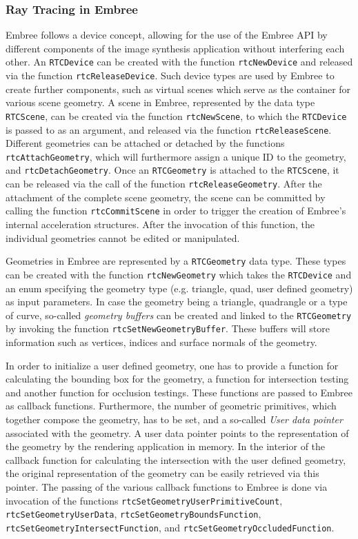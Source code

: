 \subsubsection{Ray Tracing in Embree}
Embree follows a device concept, allowing for the use of the Embree API by different components of the image synthesis application without interfering each other. An \texttt{RTCDevice} can be created with the function \texttt{rtcNewDevice} and released via the function \texttt{rtcReleaseDevice}. Such device types are used by Embree to create further components, such as virtual scenes which serve as the container for various scene geometry. A scene in Embree, represented by the data type \texttt{RTCScene}, can be created via the function \texttt{rtcNewScene}, to which the \texttt{RTCDevice} is passed to as an argument, and released via the function \texttt{rtcReleaseScene}. Different geometries can be attached or detached by the functions \texttt{rtcAttachGeometry}, which will furthermore assign a unique ID to the geometry, and \texttt{rtcDetachGeometry}. Once an \texttt{RTCGeometry} is attached to the \texttt{RTCScene}, it can be released via the call of the function \texttt{rtcReleaseGeometry}.
After the attachment of the complete scene geometry, the scene can be committed by calling the function \texttt{rtcCommitScene} in order to trigger the creation of Embree's internal acceleration structures. After the invocation of this function, the individual geometries cannot be edited or manipulated.

Geometries in Embree are represented by a \texttt{RTCGeometry} data type. These types can be created with the function \texttt{rtcNewGeometry} which takes the \texttt{RTCDevice} and an enum specifying the geometry type (e.g. triangle, quad, user defined geometry) as input parameters. In case the geometry being a triangle, quadrangle or a type of curve, so-called \emph{geometry buffers} can be created and linked to the \texttt{RTCGeometry} by invoking the function \texttt{rtcSetNewGeometryBuffer}. These buffers will store information such as vertices, indices and surface normals of the geometry.  

In order to initialize a user defined geometry, one has to provide a function for calculating the bounding box for the geometry, a function for intersection testing and another function for occlusion testings. These functions are passed to Embree as callback functions. Furthermore, the number of geometric primitives, which together compose the geometry, has to be set, and a so-called \emph{User data pointer} associated with the geometry. A user data pointer points to the representation of the geometry by the rendering application in memory. In the interior of the callback function for calculating the intersection with the user defined geometry, the original representation of the geometry can be easily retrieved via this pointer. The passing of the various callback functions to Embree is done via invocation of the functions \texttt{rtcSetGeometryUserPrimitiveCount}, \texttt{rtcSetGeometryUserData}, \texttt{rtcSetGeometryBoundsFunction}, \texttt{rtcSetGeometryIntersectFunction}, \newline and \texttt{rtcSetGeometryOccludedFunction}.

